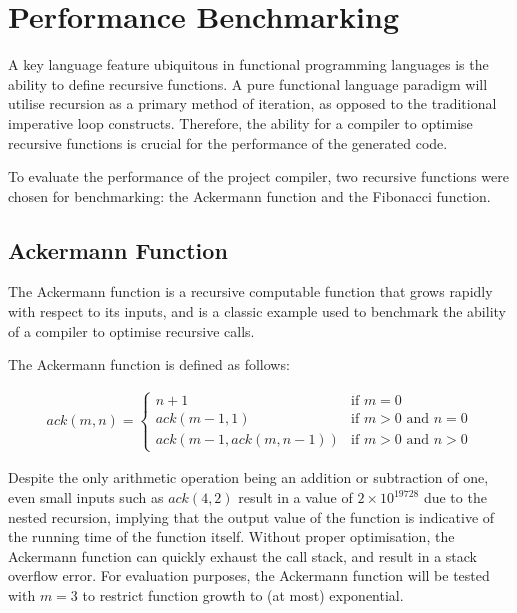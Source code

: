 \section{Performance Benchmarking}

A key language feature ubiquitous in functional programming languages is the ability to define
recursive functions. A pure functional language paradigm will utilise recursion as a primary method
of iteration, as opposed to the traditional imperative loop constructs. Therefore, the ability for a
compiler to optimise recursive functions is crucial for the performance of the generated code.

To evaluate the performance of the project compiler, two recursive functions were chosen for
benchmarking: the Ackermann function and the Fibonacci function.

\subsection{Ackermann Function}

The Ackermann function is a recursive computable function that grows rapidly with respect to its
inputs, and is a classic example used to benchmark the ability of a compiler to optimise recursive
calls.

The Ackermann function is defined as follows:

\singlespacing
\vspace{-0.7cm}
\begin{align*}
    ack(m, n) = \begin{cases}
        n + 1 & \text{if } m = 0 \\
        ack(m - 1, 1) & \text{if } m > 0 \text{ and } n = 0 \\
        ack(m - 1, ack(m, n - 1)) & \text{if } m > 0 \text{ and } n > 0
    \end{cases}
\end{align*}
\doublespacing

Despite the only arithmetic operation being an addition or subtraction of one, even small inputs
such as $ack(4,2)$ result in a value of $2 \times 10^{19728}$ due to the nested recursion, implying
that the output value of the function is indicative of the running time of the function itself.
Without proper optimisation, the Ackermann function can quickly exhaust the call stack, and result
in a stack overflow error. For evaluation purposes, the Ackermann function will be tested with $m=3$
to restrict function growth to (at most) exponential.

